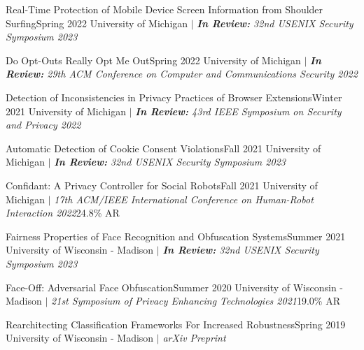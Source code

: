
    \CVSubheading
      {{Real-Time Protection of Mobile Device Screen Information from Shoulder Surfing}\cite{ShoulderSurfing}}{Spring 2022}
      {{University of Michigan} $|$ \emph{\small{\textbf{In Review:} 32nd USENIX Security Symposium 2023}}}{}

    \CVSubheading
      {{Do Opt-Outs Really Opt Me Out}\cite{OptOutChk}}{Spring 2022}
      {{University of Michigan} $|$ \emph{\small{\textbf{In Review:} 29th ACM Conference on Computer and Communications Security 2022}}}{}

    \CVSubheading
      {{Detection of Inconsistencies in Privacy Practices of Browser Extensions}\cite{BrowserExtensions}}{Winter 2021}
      {{University of Michigan} $|$ \emph{\small{\textbf{In Review:} 43rd IEEE Symposium on Security and Privacy 2022}}}{}

    \CVSubheading
      {{Automatic Detection of Cookie Consent Violations}\cite{ConsentChk}}{Fall 2021}
      {{University of Michigan} $|$ \emph{\small{\textbf{In Review:} 32nd USENIX Security Symposium 2023}}}{}

    \CVSubheading
      {{Confidant: A Privacy Controller for Social Robots}\cite{HRIPrivacy}}{Fall 2021}
      {{University of Michigan} $|$ \emph{\small{17th ACM/IEEE International Conference on Human-Robot Interaction 2022}}}{24.8\% AR}
      
      
      
    \CVSubheading
      {{Fairness Properties of Face Recognition and Obfuscation Systems}\cite{Fairness}}{Summer 2021}
      {{University of Wisconsin - Madison} $|$ \emph{\small{\textbf{In Review:} 32nd USENIX Security Symposium 2023}}}{}

    \CVSubheading
      {{Face-Off: Adversarial Face Obfuscation}\cite{FaceOff}}{Summer 2020}
      {{University of Wisconsin - Madison} $|$ \emph{\small{21st Symposium of Privacy Enhancing Technologies 2021}}}{19.0\% AR}


    \CVSubheading
      {{Rearchitecting Classification Frameworks For Increased Robustness}\cite{Robustness}}{Spring 2019}
      {{University of Wisconsin - Madison} $|$ \emph{\small{arXiv Preprint}}}{}

  \CVSubHeadingListEnd